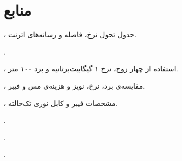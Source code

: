 \section{منابع}


\href{https://www.ieee802.org/misc-docs/GlobeCom2009/IEEE_802d3_Law.pdf}{}، جدول تحول نرخ، فاصله و رسانه‌های اترنت.

\href{https://www.belden.com/products/cable/coax-triax-cable/50-ohm-coax-cable/mrg5800}{}.

\href{https://www.ieee802.org/3/minutes/july98/E2_0798.pdf}{}، استفاده از چهار زوج، نرخ ۱ گیگابیت‌برثانیه و برد ۱۰۰ متر.

\href{https://www.cisco.com/c/en/us/td/docs/sanity/suman/CPwE-Physical-Infrastructure_Feb2023.html}{}، مقایسه‌ی برد، نرخ، نویز و هزینه‌ی مس و فیبر.

\href{https://www.itu.int/rec/T-REC-G.652-202408-I/en}{}، مشخصات فیبر و کابل نوری تک‌حالته.

\href{https://www.rfc-editor.org/rfc/rfc1122.html}{}.

\href{https://www.iso.org/standard/20269.html}{}.

\href{https://www.ti.com/lit/ds/symlink/dp83826ai.pdf}{}.

